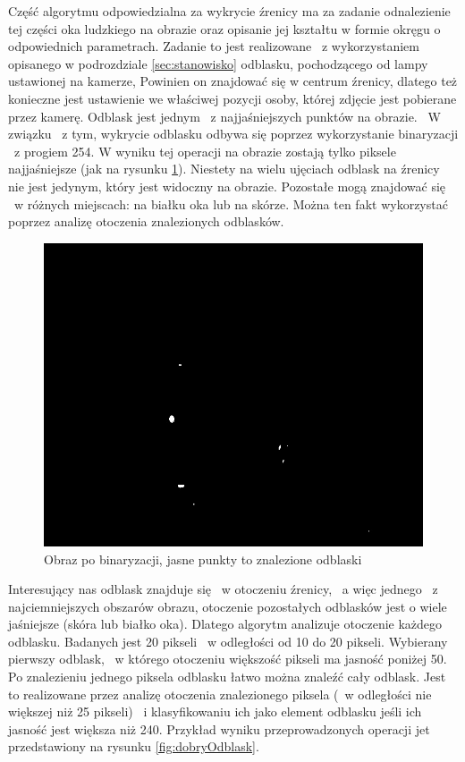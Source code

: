 Część algorytmu odpowiedzialna za wykrycie źrenicy ma za zadanie odnalezienie tej części oka ludzkiego na obrazie oraz opisanie jej kształtu w formie okręgu o odpowiednich parametrach. Zadanie to jest realizowane ~z wykorzystaniem opisanego w podrozdziale \ref{sec:stanowisko} odblasku, pochodzącego od lampy ustawionej na kamerze, Powinien on znajdować się w centrum źrenicy, dlatego też konieczne jest ustawienie we właściwej pozycji osoby, której zdjęcie jest pobierane przez kamerę. Odblask jest jednym ~z najjaśniejszych punktów na obrazie. ~W związku ~z tym, wykrycie odblasku odbywa się poprzez wykorzystanie binaryzacji ~z progiem 254. W wyniku tej operacji na obrazie zostają tylko piksele najjaśniejsze (jak na rysunku \ref{fig:binaryzacja}). Niestety na wielu ujęciach odblask na źrenicy nie jest jedynym, który jest widoczny na obrazie. Pozostałe mogą znajdować się ~w różnych miejscach: na białku oka lub na skórze. Można ten fakt wykorzystać poprzez analizę otoczenia znalezionych odblasków. 

\begin{figure}
\begin{center}
\includegraphics[scale=0.5]{binaryzacja.jpg}
\caption{Obraz po binaryzacji, jasne punkty to znalezione odblaski}
\label{fig:binaryzacja}
\end{center}
\end{figure}

Interesujący nas odblask znajduje się ~w otoczeniu źrenicy, ~a więc jednego ~z najciemniejszych obszarów obrazu, otoczenie pozostałych odblasków jest o wiele jaśniejsze (skóra lub białko oka). Dlatego algorytm analizuje otoczenie każdego odblasku. Badanych jest 20 pikseli ~w odległości od 10 do 20 pikseli. Wybierany pierwszy odblask, ~w którego otoczeniu większość pikseli ma jasność poniżej 50. Po znalezieniu jednego piksela odblasku łatwo można znaleźć cały odblask. Jest to realizowane przez analizę otoczenia znalezionego piksela (~w odległości nie większej niż 25 pikseli) ~i klasyfikowaniu ich jako element odblasku jeśli ich jasność jest większa niż 240. Przykład wyniku przeprowadzonych operacji jet przedstawiony na rysunku \ref{fig:dobryOdblask}.

